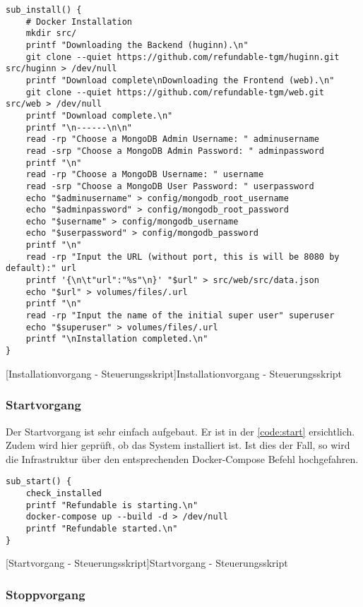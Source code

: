 \begin{verbatim}
sub_install() {
	# Docker Installation
	mkdir src/
	printf "Downloading the Backend (huginn).\n"
	git clone --quiet https://github.com/refundable-tgm/huginn.git src/huginn > /dev/null
	printf "Download complete\nDownloading the Frontend (web).\n"
	git clone --quiet https://github.com/refundable-tgm/web.git src/web > /dev/null
	printf "Download complete.\n"
	printf "\n------\n\n"
	read -rp "Choose a MongoDB Admin Username: " adminusername
	read -srp "Choose a MongoDB Admin Password: " adminpassword
	printf "\n"
	read -rp "Choose a MongoDB Username: " username
	read -srp "Choose a MongoDB User Password: " userpassword
	echo "$adminusername" > config/mongodb_root_username
	echo "$adminpassword" > config/mongodb_root_password
	echo "$username" > config/mongodb_username
	echo "$userpassword" > config/mongodb_password
	printf "\n"
	read -rp "Input the URL (without port, this is will be 8080 by default):" url
	printf '{\n\t"url":"%s"\n}' "$url" > src/web/src/data.json
	echo "$url" > volumes/files/.url
	printf "\n"
	read -rp "Input the name of the initial super user" superuser
	echo "$superuser" > volumes/files/.url
	printf "\nInstallation completed.\n"
}
\end{verbatim}
[Installationvorgang - Steuerungsskript]{Installationvorgang - Steuerungsskript}
\label{code:installer}

\subsubsection{Startvorgang}

Der Startvorgang ist sehr einfach aufgebaut. Er ist in der \autoref{code:start} ersichtlich. Zudem wird hier geprüft, ob das System installiert ist. Ist dies der Fall, so wird die Infrastruktur über den entsprechenden Docker-Compose Befehl hochgefahren. 

\newpage

\begin{verbatim}
sub_start() {
	check_installed
	printf "Refundable is starting.\n"
	docker-compose up --build -d > /dev/null
	printf "Refundable started.\n"
}
\end{verbatim}
[Startvorgang - Steuerungsskript]{Startvorgang - Steuerungsskript}
\label{code:start}

\subsubsection{Stoppvorgang}

